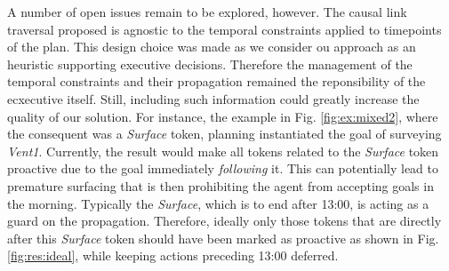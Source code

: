 A number of open issues remain to be explored, however. The causal
link traversal proposed is agnostic to the temporal constraints
applied to timepoints of the plan. This design choice was made as we
consider ou approach as an heuristic supporting executive
decisions. Therefore the management of the temporal constraints and
their propagation remained the reponsibility of the ecxecutive itself.
Still,  including such information could greatly increase the quality of our solution.  
For instance, the example in Fig. \ref{fig:ex:mixed2}, where the consequent
was a {\em Surface} token, planning instantiated the
goal of surveying \emph{Vent1}. Currently, the result would
make all tokens related to the {\em Surface} token
proactive due to the goal immediately \emph{following}
it.
This can potentially lead to premature surfacing that is then
prohibiting the agent from accepting goals in the morning. Typically
the {\em Surface}, which is to end after 13:00, is acting
as a guard on the propagation.
Therefore, ideally only those tokens that are directly after this
{\em Surface} token should have been marked as proactive as shown in
Fig. \ref{fig:res:ideal}, while keeping actions preceding 13:00 deferred.

